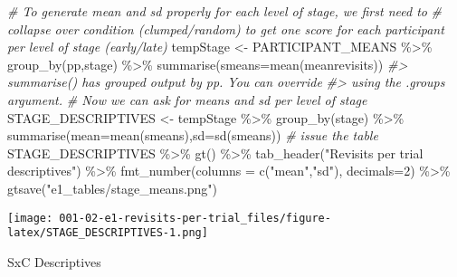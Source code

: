\documentclass[
]{book}
\newenvironment{Shaded}{\begin{snugshade}}{\end{snugshade}}
\newcommand{\AttributeTok}[1]{\textcolor[rgb]{0.77,0.63,0.00}{#1}}
\newcommand{\CommentTok}[1]{\textcolor[rgb]{0.56,0.35,0.01}{\textit{#1}}}
\newcommand{\DecValTok}[1]{\textcolor[rgb]{0.00,0.00,0.81}{#1}}
\newcommand{\FunctionTok}[1]{\textcolor[rgb]{0.00,0.00,0.00}{#1}}
\newcommand{\NormalTok}[1]{#1}
\newcommand{\OtherTok}[1]{\textcolor[rgb]{0.56,0.35,0.01}{#1}}
\newcommand{\SpecialCharTok}[1]{\textcolor[rgb]{0.00,0.00,0.00}{#1}}
\newcommand{\StringTok}[1]{\textcolor[rgb]{0.31,0.60,0.02}{#1}}
\theoremstyle{definition}
\theoremstyle{definition}
\theoremstyle{definition}
\theoremstyle{definition}
\theoremstyle{remark}
\begin{document}
\begin{Shaded}
\begin{Highlighting}[]
\CommentTok{\# To generate mean and sd properly for each level of stage, we first need to }
\CommentTok{\# collapse over condition (clumped/random) to get one score for each participant per level of stage (early/late)}
\NormalTok{tempStage }\OtherTok{\textless{}{-}}\NormalTok{ PARTICIPANT\_MEANS }\SpecialCharTok{\%\textgreater{}\%} \FunctionTok{group\_by}\NormalTok{(pp,stage) }\SpecialCharTok{\%\textgreater{}\%} \FunctionTok{summarise}\NormalTok{(}\AttributeTok{smeans=}\FunctionTok{mean}\NormalTok{(meanrevisits))}
\CommentTok{\#\textgreater{} \textasciigrave{}summarise()\textasciigrave{} has grouped output by \textquotesingle{}pp\textquotesingle{}. You can override}
\CommentTok{\#\textgreater{} using the \textasciigrave{}.groups\textasciigrave{} argument.}
\CommentTok{\# Now we can ask for means and sd per level of stage}
\NormalTok{STAGE\_DESCRIPTIVES }\OtherTok{\textless{}{-}}\NormalTok{ tempStage  }\SpecialCharTok{\%\textgreater{}\%} \FunctionTok{group\_by}\NormalTok{(stage) }\SpecialCharTok{\%\textgreater{}\%} \FunctionTok{summarise}\NormalTok{(}\AttributeTok{mean=}\FunctionTok{mean}\NormalTok{(smeans),}\AttributeTok{sd=}\FunctionTok{sd}\NormalTok{(smeans))}
\CommentTok{\# issue the table}
\NormalTok{STAGE\_DESCRIPTIVES }\SpecialCharTok{\%\textgreater{}\%} 
  \FunctionTok{gt}\NormalTok{() }\SpecialCharTok{\%\textgreater{}\%} 
  \FunctionTok{tab\_header}\NormalTok{(}\StringTok{"Revisits per trial descriptives"}\NormalTok{) }\SpecialCharTok{\%\textgreater{}\%} 
  \FunctionTok{fmt\_number}\NormalTok{(}\AttributeTok{columns =} \FunctionTok{c}\NormalTok{(}\StringTok{"mean"}\NormalTok{,}\StringTok{"sd"}\NormalTok{), }\AttributeTok{decimals=}\DecValTok{2}\NormalTok{) }\SpecialCharTok{\%\textgreater{}\%} 
  \FunctionTok{gtsave}\NormalTok{(}\StringTok{"e1\_tables/stage\_means.png"}\NormalTok{)}
\end{Highlighting}
\end{Shaded}

\texttt{[image: 001-02-e1-revisits-per-trial\_files/figure-latex/STAGE\_DESCRIPTIVES-1.png]}

SxC Descriptives
\end{document}
